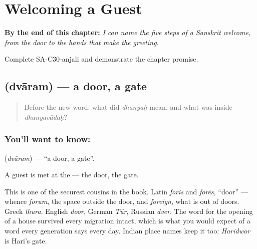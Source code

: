 
\chapter{Welcoming a Guest}
\label{ch:sa-welcome}

\begin{chapteropening}
\textbf{By the end of this chapter:} \emph{I can name the five steps of a Sanskrit welcome, from the door to the hands that make the greeting.}

Complete SA-C30-anjali and demonstrate the chapter promise.
\end{chapteropening}

\section[\texorpdfstring{\sk{द्वारम्} (dvāram)}{द्वारम् (dvāram)}]{ (dvāram) — a door, a gate}

\label{lesson:SA-C30-door}



\begin{quote}
Before the new word: what did \emph{dhanyaḥ} mean, and what was inside \emph{dhanyavādaḥ}?
\end{quote}

\subsection*{You'll want to know: }
\textbf{} (\emph{dvāram}) — \textquotedblleft{}a door, a gate\textquotedblright{}.

A guest is met at the \textbf{} — the door, the gate.

This is one of the securest cousins in the book. Latin \emph{foris} and \emph{forēs}, \textquotedblleft{}door\textquotedblright{} — whence \emph{forum}, the space outside the door, and \emph{foreign}, what is out of doors. Greek \emph{thura}. English \emph{door}, German \emph{Tür}, Russian \emph{dver}. The word for the opening of a house survived every migration intact, which is what you would expect of a word every generation says every day. Indian place names keep it too: \emph{Haridwar} is Hari's gate.

